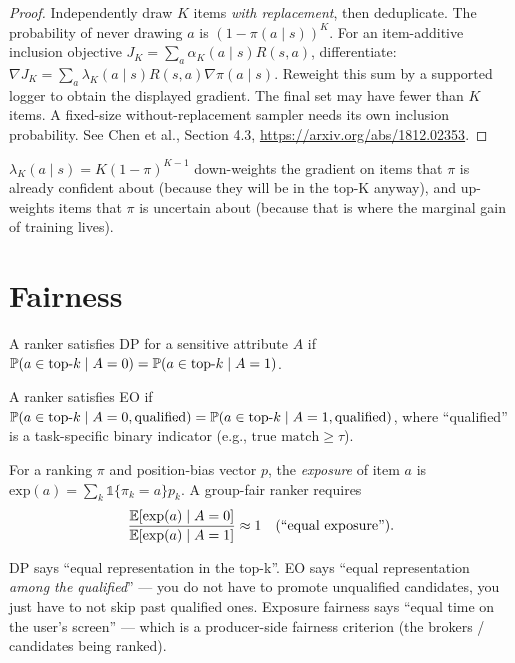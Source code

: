 \documentclass[11pt,oneside]{scrbook}
\begin{document}
\begin{proof}
Independently draw $K$ items \emph{with replacement}, then deduplicate.
The probability of never drawing $a$ is $(1-\pi(a\mid s))^K$.
For an item-additive inclusion objective
$J_K=\sum_a\alpha_K(a\mid s)R(s,a)$, differentiate:
$\nabla J_K=\sum_a\lambda_K(a\mid s)R(s,a)\nabla\pi(a\mid s)$.
Reweight this sum by a supported logger to obtain the displayed gradient.
The final set may have fewer than $K$ items. A fixed-size without-replacement
sampler needs its own inclusion probability. See Chen et al., Section 4.3,
\url{https://arxiv.org/abs/1812.02353}.
\end{proof}

\begin{intuition}
$\lambda_K(a \mid s) = K(1 - \pi)^{K-1}$ down-weights the gradient on items
that $\pi$ is already confident about (because they will be in the top-K
anyway), and up-weights items that $\pi$ is uncertain about (because that
is where the marginal gain of training lives).
\end{intuition}

\section{Fairness}

\begin{definition}
A ranker satisfies DP for a sensitive attribute $A$ if
$\mathbb{P}(a \in \text{top-}k \mid A = 0) = \mathbb{P}(a \in \text{top-}k \mid A = 1)$.
\end{definition}

\begin{definition}
A ranker satisfies EO if
$\mathbb{P}(a \in \text{top-}k \mid A = 0, \text{qualified}) = \mathbb{P}(a \in \text{top-}k \mid A = 1, \text{qualified})$,
where ``qualified'' is a task-specific binary indicator (e.g.,
$\text{true match} \geq \tau$).
\end{definition}

\begin{definition}
For a ranking $\pi$ and position-bias vector $p$, the \emph{exposure} of
item $a$ is $\mathrm{exp}(a) = \sum_k \mathbb{1}\{\pi_k = a\} p_k$. A
group-fair ranker requires
\[
\frac{\mathbb{E}[\mathrm{exp}(a) \mid A=0]}{\mathbb{E}[\mathrm{exp}(a) \mid A=1]} \approx 1
\quad\text{(``equal exposure'')}.
\]
\end{definition}

\begin{intuition}
DP says ``equal representation in the top-k''. EO says ``equal representation
\emph{among the qualified}'' --- you do not have to promote unqualified
candidates, you just have to not skip past qualified ones. Exposure
fairness says ``equal time on the user's screen'' --- which is a producer-side
fairness criterion (the brokers / candidates being ranked).
\end{intuition}
\end{document}
